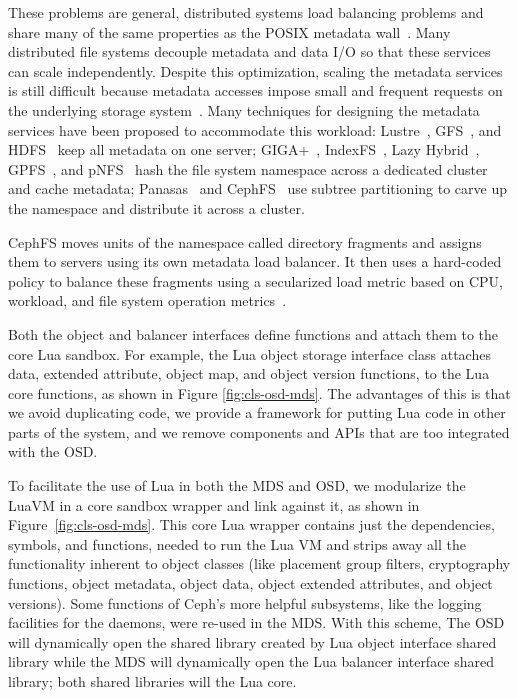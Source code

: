 \documentclass[10pt,twocolumn]{article}
\begin{document}
These problems are general, distributed systems load balancing problems and
share many of the same properties as the POSIX metadata
wall~\cite{alam:pdsw2011-metadata-scaling,ghemawat:sosp2003-gfs,hildebrand:msst2005-pnfs,weil_ceph_2006,welch:fast2008-panasas,shvachko:login2012-hdfs-scalability}.
Many distributed file systems decouple metadata and data I/O so that these
services can scale independently. Despite this optimization, scaling the
metadata services is still difficult because metadata accesses impose small
and frequent requests on the underlying storage
system~\cite{roselli:atec2000-FS-workloads}. Many techniques for designing the
metadata services have been proposed to accommodate this workload:
Lustre~\cite{konstantinos:pdsw2014-lustre-metadata},
GFS~\cite{ghemawat:sosp2003-gfs}, and
HDFS~\cite{shvachko:login2012-hdfs-scalability} keep all metadata on one
server; GIGA+~\cite{patil:fast2011-giga}, IndexFS~\cite{ren:sc2014-indexfs},
Lazy Hybrid~\cite{brandt:msst2003-lh}, GPFS~\cite{schmuck:fast2002-gpfs}, and
pNFS~\cite{hildebrand:supercomputing2006-pNFS} hash the file system namespace
across a dedicated cluster and cache metadata;
Panasas~\cite{welch:fast2008-panasas} and
CephFS~\cite{weil:sc2004-dyn-metadata} use subtree partitioning to carve up
the namespace and distribute it across a cluster.

CephFS moves units of the namespace called directory fragments and assigns
them to servers using  its own metadata load balancer. It then uses a
hard-coded policy to balance these fragments using a secularized load metric
based on CPU, workload, and file system operation
metrics~\cite{sevilla:sc15-mantle}.

Both the object and balancer interfaces define functions and attach them
to the core Lua sandbox. For example, the Lua object storage interface
class attaches data, extended attribute, object map, and object version
functions, to the Lua core functions, as shown in Figure
\ref{fig:cls-osd-mds}. The advantages of this is that we avoid
duplicating code, we provide a framework for putting Lua code in other
parts of the system, and we remove components and APIs that are too
integrated with the OSD.

To facilitate the use of Lua in both the MDS and OSD, we modularize the LuaVM
in a core sandbox wrapper and link against it, as shown in
Figure~\ref{fig:cls-osd-mds}. This core Lua wrapper contains just the
dependencies, symbols, and functions, needed to run the Lua VM and strips away
all the functionality inherent to object classes (like placement group
filters, cryptography functions, object metadata,  object data, object
extended attributes, and object versions). Some functions of Ceph's more
helpful subsystems, like the logging facilities for the daemons, were re-used
in the MDS.  With this scheme, The OSD will dynamically open the shared
library created by Lua object interface shared library while the MDS will
dynamically open the Lua balancer interface shared library; both shared
libraries will the Lua core.
\end{document}
